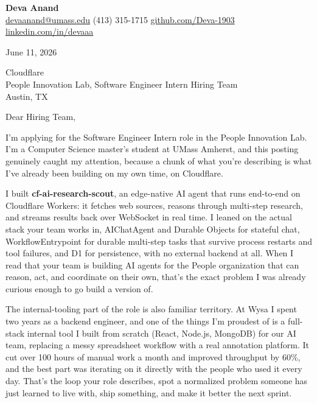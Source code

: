 \documentclass[letterpaper,11pt]{article}
\begin{document}
\begin{center}
  {\LARGE \bfseries \textcolor{ResumeNavy}{Deva Anand}} \\[3pt]
  {\small
  \href{mailto:devaanand@umass.edu}{devaanand@umass.edu} \enspace\textbar\enspace
  (413) 315-1715 \enspace\textbar\enspace
  \href{https://github.com/Deva-1903}{github.com/Deva-1903} \enspace\textbar\enspace
  \href{https://linkedin.com/in/devaaa/}{linkedin.com/in/devaaa}}
\end{center}
\vspace{6pt}

June 11, 2026

\vspace{2pt}
Cloudflare \\
People Innovation Lab, Software Engineer Intern Hiring Team \\
Austin, TX

\vspace{6pt}
Dear Hiring Team,

I'm applying for the Software Engineer Intern role in the People Innovation Lab. I'm a Computer Science master's student at UMass Amherst, and this posting genuinely caught my attention, because a chunk of what you're describing is what I've already been building on my own time, on Cloudflare.

I built \textbf{cf-ai-research-scout}, an edge-native AI agent that runs end-to-end on Cloudflare Workers: it fetches web sources, reasons through multi-step research, and streams results back over WebSocket in real time. I leaned on the actual stack your team works in, AIChatAgent and Durable Objects for stateful chat, WorkflowEntrypoint for durable multi-step tasks that survive process restarts and tool failures, and D1 for persistence, with no external backend at all. When I read that your team is building AI agents for the People organization that can reason, act, and coordinate on their own, that's the exact problem I was already curious enough to go build a version of.

The internal-tooling part of the role is also familiar territory. At Wysa I spent two years as a backend engineer, and one of the things I'm proudest of is a full-stack internal tool I built from scratch (React, Node.js, MongoDB) for our AI team, replacing a messy spreadsheet workflow with a real annotation platform. It cut over 100 hours of manual work a month and improved throughput by 60\%, and the best part was iterating on it directly with the people who used it every day. That's the loop your role describes, spot a normalized problem someone has just learned to live with, ship something, and make it better the next sprint.
\end{document}
